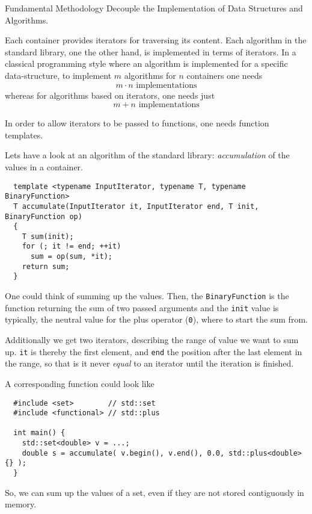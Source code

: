 \begin{guideline}{Fundamental Methodology}
  Decouple the Implementation of Data Structures and Algorithms.
\end{guideline}

Each container provides iterators for traversing its content. Each algorithm in the standard library, one the other hand, is implemented in terms
of iterators. In a classical programming style where an algorithm is implemented for a specific data-structure, to implement $m$ algorithms for
$n$ containers one needs
\[
  m\cdot n\text{ implementations}
\]
whereas for algorithms based on iterators, one needs just
\[
  m+n\text{ implementations}
\]

In order to allow iterators to be passed to functions, one needs function templates.

\begin{example}
  Lets have a look at an algorithm of the standard library: \emph{accumulation} of the values in a container.
  \begin{verbatim}
  template <typename InputIterator, typename T, typename BinaryFunction>
  T accumulate(InputIterator it, InputIterator end, T init, BinaryFunction op)
  {
    T sum(init);
    for (; it != end; ++it)
      sum = op(sum, *it);
    return sum;
  }
  \end{verbatim}

  One could think of summing up the values. Then, the \texttt{BinaryFunction} is the function returning
  the sum of two passed arguments and the \texttt{init} value is typically, the neutral value for the plus
  operator (\texttt{0}), \ie where to start the sum from.

  Additionally we get two iterators, describing the range of value we want to sum up. \texttt{it} is thereby the
  first element, and \texttt{end} the position after the last element in the range, so that is it never \textit{equal}
  to an iterator until the iteration is finished.

  A corresponding  function could look like
  \begin{verbatim}
  #include <set>        // std::set
  #include <functional> // std::plus

  int main() {
    std::set<double> v = ...;
    double s = accumulate( v.begin(), v.end(), 0.0, std::plus<double>{} );
  }
  \end{verbatim}
  So, we can sum up the values of a set, even if they are not stored contiguously in memory.
\end{example}



